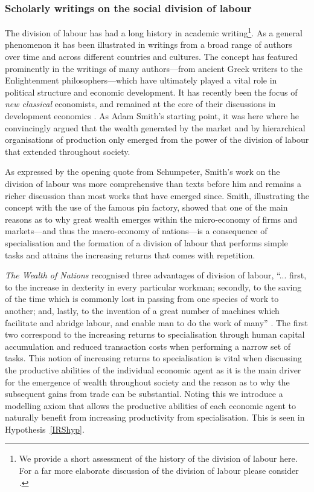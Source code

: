 \subsubsection{Scholarly writings on the social division of labour}

The division of labour has had a long history in academic writing\footnote{We provide a short assessment of the history of the division of labour here. For a far more elaborate discussion of the division of labour please consider \citet{Sun2012}.}. As a general phenomenon it has been illustrated in writings from a broad range of authors over time and across different countries and cultures. The concept has featured prominently in the writings of many authors---from ancient Greek writers to the Enlightenment philosophers---which have ultimately played a vital role in political structure and economic development. It has recently been the focus of \emph{new classical} economists, and remained at the core of their discussions in development economics \citep{Yang2003}. As Adam Smith's starting point, it was here where he convincingly argued that the wealth generated by the market and by hierarchical organisations of production only emerged from the power of the division of labour that extended throughout society.

As expressed by the opening quote from Schumpeter, Smith's work on the division of labour was more comprehensive than texts before him and remains a richer discussion than most works that have emerged since. Smith, illustrating the concept with the use of the famous pin factory, showed that one of the main reasons as to why great wealth emerges within the micro-economy of firms and markets---and thus the macro-economy of nations---is a consequence of specialisation and the formation of a division of labour that performs simple tasks and attains the increasing returns that comes with repetition.

\emph{The Wealth of Nations} recognised three advantages of division of labour, ``... first, to the increase in dexterity in every particular workman; secondly, to the saving of the time which is commonly lost in passing from one species of work to another; and, lastly, to the invention of a great number of machines which facilitate and abridge labour, and enable man to do the work of many'' \citep[p.~7]{Smith1776}. The first two correspond to the increasing returns to specialisation through human capital accumulation and reduced transaction costs when performing a narrow set of tasks. This notion of increasing returns to specialisation is vital when discussing the productive abilities of the individual economic agent as it is the main driver for the emergence of wealth throughout society and the reason as to why the subsequent gains from trade can be substantial. Noting this we introduce a modelling axiom that allows the productive abilities of each economic agent to naturally benefit from increasing productivity from specialisation. This is seen in Hypothesis~\ref{IRShyp}.

